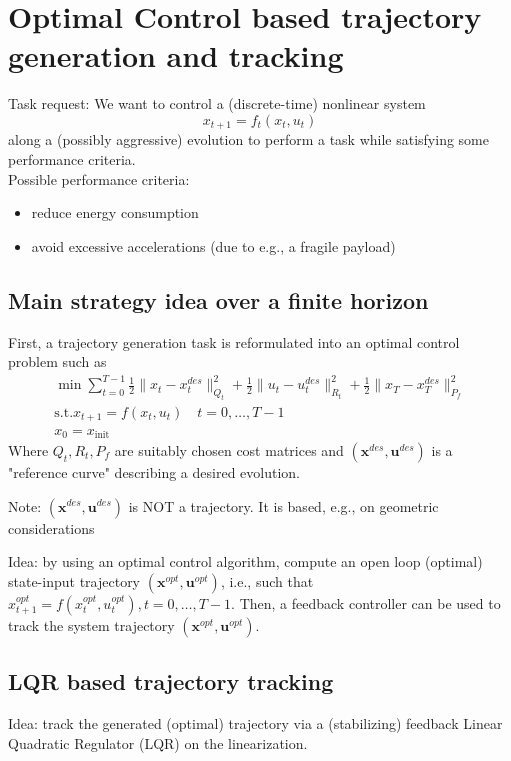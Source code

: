 \documentclass[openany]{book}
\theoremstyle{definition}
\theoremstyle{remark}
\begin{document}
\chapter{Optimal Control based trajectory generation and tracking}
Task request: We want to control a (discrete-time) nonlinear system 
\[
    x_{t+1}=f_t(x_t,u_t)
\]
along a (possibly aggressive) evolution to perform a task while satisfying some performance criteria.
\\Possible performance criteria:
\begin{itemize}
    \item reduce energy consumption
    \item avoid excessive accelerations (due to e.g., a fragile payload)
\end{itemize}
\section{Main strategy idea over a finite horizon} 
First, a trajectory generation task is reformulated into an optimal control problem such as 
\begin{align*}
    \min \sum_{t=0}^{T-1} \displaystyle\frac{1}{2} \| x_t-x_t^{des}\|_{Q_t}^2+ \displaystyle\frac{1}{2}\|u_t-u_t^{des}\|^2_{R_t}+\displaystyle\frac{1}{2}\|x_T-x_T^{des}\|^2_{P_f} \\
    \text{s.t.} x_{t+1} = f(x_t,u_t) \quad t=0,\dots,T-1\\
    x_0 = x_{\text{init}}
\end{align*}
Where $Q_t,R_t,P_f$ are suitably chosen cost matrices and $(\mathbf{x}^{des},\mathbf{u}^{des})$ is a "reference curve" describing a desired evolution. 

Note: $(\mathbf{x}^{des},\mathbf{u}^{des})$ is NOT a trajectory. It is based, e.g., on geometric considerations

Idea: by using an optimal control algorithm, compute an open loop (optimal) state-input trajectory $(\mathbf{x}^{opt},\mathbf{u}^{opt})$, i.e., such that $x_{t+1}^{opt}=f(x_t^{opt},u_t^{opt}),  t=0,\dots,T-1$. Then, a feedback controller can be used to track the system trajectory $(\mathbf{x}^{opt},\mathbf{u}^{opt})$.


\section{LQR based trajectory tracking}
Idea: track the generated (optimal) trajectory via a (stabilizing) feedback Linear Quadratic Regulator (LQR) on the linearization.
\end{document}
